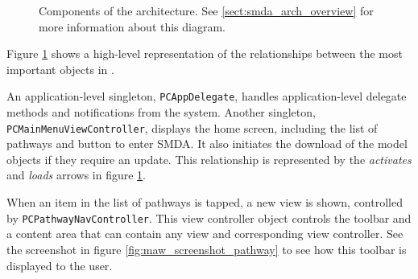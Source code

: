 \begin{figure}[p]
    \caption{\label{fig:maw_components} Components of the architecture. See
    \ref{sect:smda_arch_overview} for more information about this diagram.}
\end{figure}

Figure \ref{fig:maw_components} shows a high-level representation of the
relationships between the most important objects in \mawapp.

An application-level singleton, \texttt{PCAppDelegate}, handles
application-level delegate methods and notifications from the system. Another
singleton, \texttt{PCMainMenuViewController}, displays the home screen,
including the list of pathways and button to enter SMDA. It also initiates the
download of the model objects if they require an update. This relationship is
represented by the \emph{activates} and \emph{loads} arrows in figure
\ref{fig:maw_components}.

When an item in the list of pathways is tapped, a new view is shown, controlled
by \texttt{PCPathwayNavController}. This view controller object controls the
toolbar and a content area that can contain any view and corresponding view
controller. See the screenshot in figure \ref{fig:maw_screenshot_pathway} to see
how this toolbar is displayed to the user.

